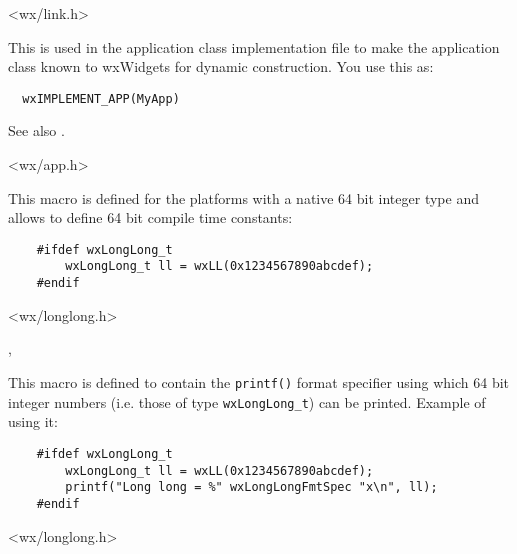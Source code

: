 <wx/link.h>


\label{wximplementapp}


This is used in the application class implementation file to make the application class 
known to wxWidgets for dynamic construction. You use this as:

\begin{verbatim}
  wxIMPLEMENT_APP(MyApp)
\end{verbatim}

See also .


<wx/app.h>


\label{wxll}


This macro is defined for the platforms with a native 64 bit integer type and
allows to define 64 bit compile time constants:

\begin{verbatim}
    #ifdef wxLongLong_t
        wxLongLong_t ll = wxLL(0x1234567890abcdef);
    #endif
\end{verbatim}


<wx/longlong.h>


, 


\label{wxlonglongfmtspec}

This macro is defined to contain the {\tt printf()} format specifier using
which 64 bit integer numbers (i.e. those of type {\tt wxLongLong\_t}) can be
printed. Example of using it:

\begin{verbatim}
    #ifdef wxLongLong_t
        wxLongLong_t ll = wxLL(0x1234567890abcdef);
        printf("Long long = %" wxLongLongFmtSpec "x\n", ll);
    #endif
\end{verbatim}




<wx/longlong.h>


\label{wxnewid}

